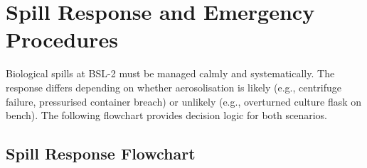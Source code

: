 
\section{Spill Response and Emergency Procedures}
\label{sec:spill}

Biological spills at BSL-2 must be managed calmly and systematically. The response
differs depending on whether aerosolisation is likely (e.g., centrifuge failure,
pressurised container breach) or unlikely (e.g., overturned culture flask on bench).
The following flowchart provides decision logic for both scenarios.

\subsection{Spill Response Flowchart}

